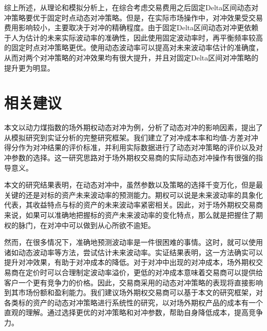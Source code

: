 综上所述，从理论和模拟分析上，在综合考虑交易费用之后固定Delta区间动态对冲策略要优于固定时点动态对冲策略。但是，在实际市场操作中，对冲效果受交易费用影响较小，主要取决于对冲的精确程度。由于固定Delta区间动态对冲更依赖于人为估计的未来实际波动率的准确性，因此使用固定波动率时，再平衡频率较高的固定时点对冲策略更优。使用动态波动率可以提高对未来波动率估计的准确度，从而对两个对冲策略的对冲效果均有很大提升，并且对固定Delta区间对冲策略的提升更为明显。

\section{相关建议}

本文以动力煤指数的场外期权动态对冲为例，分析了动态对冲的影响因素，提出了从模拟研究到实证分析的完整研究框架。我们建立了对冲成本率和均值-方差对冲得分作为对冲结果的评价标准，并利用实际数据进行了动态对冲策略的评价以及对冲参数的选择。这一研究思路对于场外期权交易商的实际动态对冲操作有很强的指导意义。

本文的研究结果表明，在动态对冲中，虽然参数以及策略的选择千变万化，但是最关键的还是对标的资产未来波动率的预测能力。期权可以说是未来波动率的具象化代表，其收益特点与标的资产的未来波动率紧密相关。因此，对于场外期权交易商来说，如果可以准确地把握标的资产未来波动率的变化特点，那么就是把握住了期权的脉门，在对冲中可以做到从心所欲不逾矩。

然而，在很多情况下，准确地预测波动率是一件很困难的事情。这时，就可以使用诸如动态波动率等方法，尝试估计未来波动率。实证结果表明，这一方法确实可以提升对冲效果，有助于对冲成本的降低。对于对冲中出现的对冲成本，场外期权交易商在定价时可以合理制定波动率溢价，更低的对冲成本意味着交易商可以提供给客户一个更有竞争力的价格。因此，交易商采用的动态对冲策略的表现将直接影响到其市场份额和盈利能力。我们建议场外期权交易商可以基于本文的研究框架，对各类标的资产的动态对冲策略进行系统性的研究，以对场外期权产品的成本有一个直观的理解。通过选择更优的对冲策略和对冲参数，帮助自身降低成本，提高竞争力。
